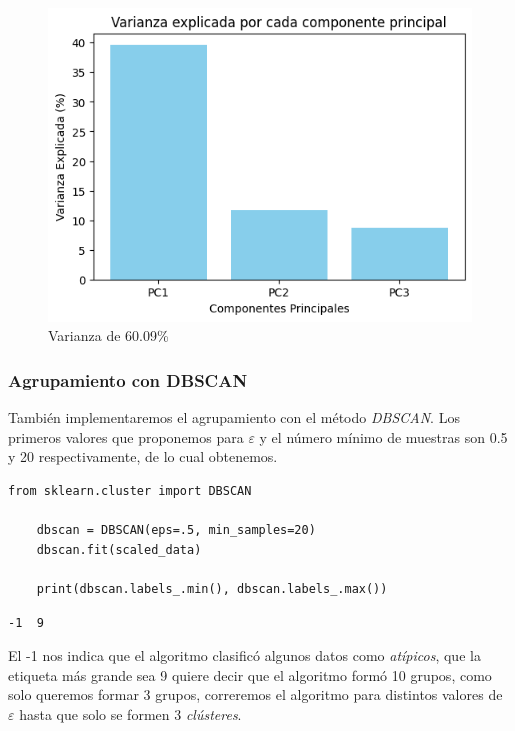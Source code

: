 \begin{figure}[!h]
    \centering
    \includegraphics[scale = 0.75]{Enrique/Imagenes/varianza_3d.png}
    \caption{Varianza de 60.09\%}
\end{figure}

\subsubsection{Agrupamiento con DBSCAN}

También implementaremos el agrupamiento con el método \textit{DBSCAN}. Los primeros valores que proponemos para $\varepsilon$ y el número mínimo de muestras son 0.5 y 20 respectivamente, de lo cual obtenemos.

\begin{lstlisting}[caption={DSCAN con $\varepsilon$=0.5}]
    from sklearn.cluster import DBSCAN

    dbscan = DBSCAN(eps=.5, min_samples=20)
    dbscan.fit(scaled_data)

    print(dbscan.labels_.min(), dbscan.labels_.max())
\end{lstlisting}

\begin{lstlisting}[caption={Salida del código}]
    -1  9 
\end{lstlisting}

El -1 nos indica que el algoritmo clasificó algunos datos como \textit{atípicos}, que la etiqueta más grande sea 9 quiere decir que el algoritmo formó 10 grupos, como solo queremos formar 3 grupos, correremos el algoritmo para distintos valores de $\varepsilon$ hasta que solo se formen 3 \textit{clústeres}.

